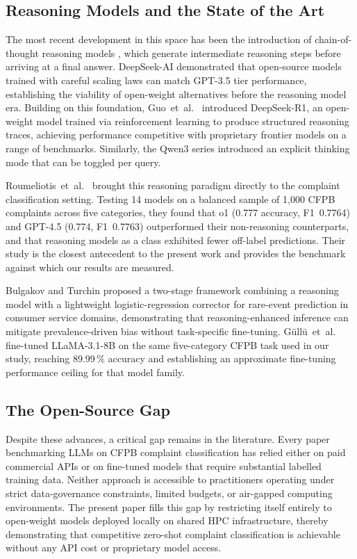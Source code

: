 \documentclass[a4paper,fleqn]{cas-dc}
\begin{document}
\subsection{Reasoning Models and the State of the Art}

The most recent development in this space has been the introduction of
chain-of-thought reasoning models \cite{wei2022chainofthought}, which
generate intermediate reasoning steps before arriving at a final answer.
DeepSeek-AI \cite{deepseekllm2024} demonstrated that open-source models
trained with careful scaling laws can match GPT-3.5 tier performance,
establishing the viability of open-weight alternatives before the
reasoning model era. Building on this foundation, Guo~et~al.\
\cite{guo2025deepseekr1} introduced DeepSeek-R1, an open-weight model
trained via reinforcement learning to produce structured reasoning
traces, achieving performance competitive with proprietary frontier
models on a range of benchmarks. Similarly, the
Qwen3 series \cite{qwen2025qwen3} introduced an explicit thinking mode
that can be toggled per query.

Roumeliotis~et~al.\ \cite{roumeliotis2025think} brought this reasoning
paradigm directly to the complaint classification setting. Testing
14 models on a balanced sample of 1,000 CFPB complaints across five
categories, they found that o1 (0.777 accuracy, F1~0.7764) and
GPT-4.5 (0.774, F1~0.7763) outperformed their non-reasoning
counterparts, and that reasoning models as a class exhibited fewer
off-label predictions. Their study is the closest antecedent to the
present work and provides the benchmark against which our results
are measured.

Bulgakov and Turchin \cite{bulgakov2026deepseek} proposed a two-stage
framework combining a reasoning model with a lightweight logistic-regression
corrector for rare-event prediction in consumer service domains,
demonstrating that reasoning-enhanced inference can mitigate
prevalence-driven bias without task-specific fine-tuning. G{\"u}ll{\"u}~et~al.\
\cite{gullu2025llama} fine-tuned LLaMA-3.1-8B on the same five-category
CFPB task used in our study, reaching 89.99\,\% accuracy and
establishing an approximate fine-tuning performance ceiling for that
model family.

\subsection{The Open-Source Gap}

Despite these advances, a critical gap remains in the literature. Every
paper benchmarking LLMs on CFPB complaint classification has relied
either on paid commercial APIs or on fine-tuned models that require
substantial labelled training data. Neither approach is accessible to
practitioners operating under strict data-governance constraints,
limited budgets, or air-gapped computing environments. The present
paper fills this gap by restricting itself entirely to open-weight
models deployed locally on shared HPC infrastructure, thereby
demonstrating that competitive zero-shot complaint classification is
achievable without any API cost or proprietary model access.
\end{document}
